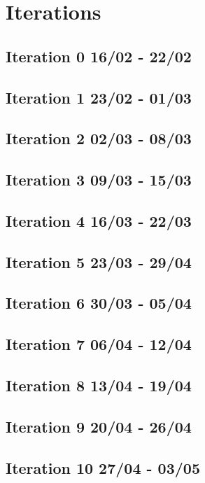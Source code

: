 \chapter{Iterations}

\section{Iteration 0 16/02 - 22/02}


\section{Iteration 1 23/02 - 01/03}


\section{Iteration 2 02/03 - 08/03}


\section{Iteration 3 09/03 - 15/03}


\section{Iteration 4 16/03 - 22/03}


\section{Iteration 5 23/03 - 29/04}


\section{Iteration 6 30/03 - 05/04}


\section{Iteration 7 06/04 - 12/04}


\section{Iteration 8 13/04 - 19/04}


\section{Iteration 9 20/04 - 26/04}


\section{Iteration 10 27/04 - 03/05}
